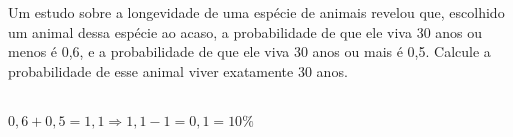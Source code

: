 \begin{ex}
Um estudo sobre a longevidade de uma espécie de animais revelou que, escolhido um animal dessa espécie ao acaso, a probabilidade de que ele viva 30 anos ou menos é 0,6, e a probabilidade de que ele viva 30 anos ou mais é 0,5. Calcule a probabilidade de esse animal viver exatamente 30 anos.
   \begin{sol}
    \phantom{A}\\
    $0,6+0,5=1,1 \Longrightarrow1,1-1=0,1=10\%$
   \end{sol}
\end{ex}